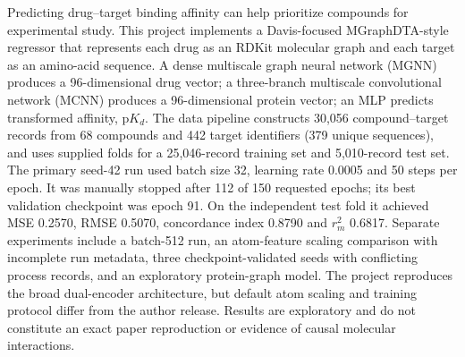 Predicting drug--target binding affinity can help prioritize compounds for experimental study. This project implements a Davis-focused MGraphDTA-style regressor that represents each drug as an RDKit molecular graph and each target as an amino-acid sequence. A dense multiscale graph neural network (MGNN) produces a 96-dimensional drug vector; a three-branch multiscale convolutional network (MCNN) produces a 96-dimensional protein vector; an MLP predicts transformed affinity, p$K_d$. The data pipeline constructs 30,056 compound--target records from 68 compounds and 442 target identifiers (379 unique sequences), and uses supplied folds for a 25,046-record training set and 5,010-record test set. The primary seed-42 run used batch size 32, learning rate 0.0005 and 50 steps per epoch. It was manually stopped after 112 of 150 requested epochs; its best validation checkpoint was epoch 91. On the independent test fold it achieved MSE 0.2570, RMSE 0.5070, concordance index 0.8790 and $r_m^2$ 0.6817. Separate experiments include a batch-512 run, an atom-feature scaling comparison with incomplete run metadata, three checkpoint-validated seeds with conflicting process records, and an exploratory protein-graph model. The project reproduces the broad dual-encoder architecture, but default atom scaling and training protocol differ from the author release. Results are exploratory and do not constitute an exact paper reproduction or evidence of causal molecular interactions.
